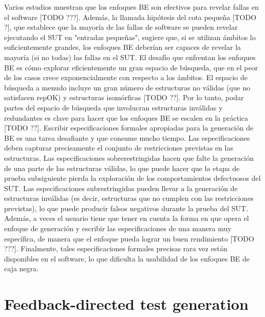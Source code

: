 Varios estudios muestran que los enfoques BE son efectivos para revelar fallas en el software [TODO ???]. Además, la llamada hipótesis del cota pequeña [TODO ?], que establece que la mayoría de las fallas de software se pueden revelar ejecutando el SUT en "entradas pequeñas", sugiere que, si se utilizan ámbitos lo suficientemente grandes, los enfoques BE deberían ser capaces de revelar la mayoría (si no todas) las fallas en el SUT. El desafío que enfrentan los enfoques BE es cómo explorar eficientemente un gran espacio de búsqueda, que en el peor de los casos crece exponencialmente con respecto a los ámbitos. El espacio de búsqueda a menudo incluye un gran número de estructuras no válidas (que no satisfacen repOK) y estructuras isomórficas [TODO ??]. Por lo tanto, podar partes del espacio de búsqueda que involucran estructuras inválidas y redundantes es clave para hacer que los enfoques BE se escalen en la práctica [TODO ??]. Escribir especificaciones formales apropiadas para la generación de BE es una tarea desafiante y que consume mucho tiempo. Las especificaciones deben capturar precisamente el conjunto de restricciones previstas en las estructuras. Las especificaciones sobrerestringidas hacen que falte la generación de una parte de las estructuras válidas, lo que puede hacer que la etapa de prueba subsiguiente pierda la exploración de los comportamientos defectuosos del SUT. Las especificaciones subrestringidas pueden llevar a la generación de estructuras inválidas (es decir, estructuras que no cumplen con las restricciones previstas), lo que puede producir falsos negativos durante la prueba del SUT. Además, a veces el usuario tiene que tener en cuenta la forma en que opera el enfoque de generación y escribir las especificaciones de una manera muy específica, de manera que el enfoque pueda lograr un buen rendimiento [TODO ???]. Finalmente, tales especificaciones formales precisas rara vez están disponibles en el software, lo que dificulta la usabilidad de los enfoques BE de caja negra.

\section{Feedback-directed test generation}\label{sec:feedback-directed-test-gen}

